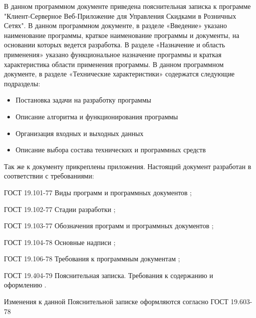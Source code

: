 

В данном программном документе приведена пояснительная записка к программе 
"Клиент-Серверное Веб-Приложение для Управления Скидками в Розничных Сетях".
В данном программном документе, в разделе «Введение» указано наименование 
программы, краткое наименование программы и документы, на основании которых 
ведется разработка.
В разделе «Назначение и область применения» указано функциональное назначение 
программы и краткая характеристика области применения программы.
В данном программном документе, в разделе «Технические характеристики» 
содержатся следующие подразделы:
\begin{itemize}
    \item Постановка задачи на разработку программы
    \item Описание алгоритма и функционирования программы
    \item Организация входных и выходных данных
    \item Описание выбора состава технических и программных средств
\end{itemize}
Так же к документу прикреплены приложения. 
Настоящий документ разработан в соответствии с требованиями:
\begin{my_enumerate}
  \item ГОСТ 19.101-77 Виды программ и программных документов \cite{gost_types_of_software};
    \item ГОСТ 19.102-77 Стадии разработки \cite{gost_stages_of_devel};
    \item ГОСТ 19.103-77 Обозначения программ и программных документов
      \cite{gost_marking_software};
    \item ГОСТ 19.104-78 Основные надписи \cite{gost_main_signs};
    \item ГОСТ 19.106-78 Требования к программным документам
      \cite{gost_demands_for_docs};
    \item ГОСТ 19.404-79 Пояснительная записка. Требования к содержанию и 
      оформлению \cite{gost_pz}.
\end{my_enumerate}
    Изменения к данной Пояснительной записке оформляются согласно ГОСТ 
19.603-78 \cite{gost_main_rules_change}
